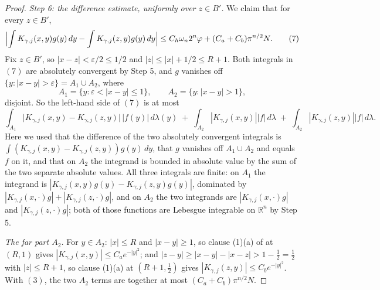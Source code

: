 \begin{proof}
\emph{Step 6: the difference estimate, uniformly over $z \in B'$.}
We claim that for every $z \in B'$,
\begin{equation*}
  \Bigl|\int K_{\gamma,j}(x,y)g(y)\,dy - \int K_{\gamma,j}(z,y)g(y)\,dy\Bigr|
    \leq C_h\omega_n2^n\varphi + (C_a+C_b)\pi^{n/2}N . \tag{7}
\end{equation*}
Fix $z \in B'$, so $|x-z| < \varepsilon/2 \leq 1/2$ and
$|z| \leq |x| + 1/2 \leq R+1$.  Both integrals in $(7)$ are absolutely
convergent by Step 5, and $g$ vanishes off
$\{y : |x-y| > \varepsilon\} = A_1 \cup A_2$, where
\[
  A_1 = \{y : \varepsilon < |x-y| \leq 1\}, \qquad A_2 = \{y : |x-y| > 1\} ,
\]
disjoint.  So the left-hand side of $(7)$ is at most
\[
  \int_{A_1}\bigl|K_{\gamma,j}(x,y)-K_{\gamma,j}(z,y)\bigr|\,|f(y)|\,d\lambda(y)
  \;+\;\int_{A_2}|K_{\gamma,j}(x,y)||f|\,d\lambda
  \;+\;\int_{A_2}|K_{\gamma,j}(z,y)||f|\,d\lambda .
\]
Here we used that the difference of the two absolutely convergent integrals is
$\int(K_{\gamma,j}(x,y)-K_{\gamma,j}(z,y))g(y)\,dy$, that $g$ vanishes off
$A_1 \cup A_2$ and equals $f$ on it, and that on $A_2$ the integrand is bounded
in absolute value by the sum of the two separate absolute values.  All three
integrals are finite: on $A_1$ the integrand is
$|K_{\gamma,j}(x,y)g(y) - K_{\gamma,j}(z,y)g(y)|$, dominated by
$|K_{\gamma,j}(x,\cdot)g| + |K_{\gamma,j}(z,\cdot)g|$, and on $A_2$ the two
integrands are $|K_{\gamma,j}(x,\cdot)g|$ and $|K_{\gamma,j}(z,\cdot)g|$; both
of those functions are Lebesgue integrable on $\mathbb{R}^n$ by Step 5.

\emph{The far part $A_2$.}  For $y \in A_2$: $|x| \leq R$ and $|x-y| \geq 1$,
so clause (1)(a) of  at $(R,1)$ gives
$|K_{\gamma,j}(x,y)| \leq C_ae^{-|y|^2}$; and
$|z-y| \geq |x-y| - |x-z| > 1 - \tfrac12 = \tfrac12$ with $|z| \leq R+1$, so
clause (1)(a) at $(R+1,\tfrac12)$ gives
$|K_{\gamma,j}(z,y)| \leq C_be^{-|y|^2}$.  With $(3)$, the two $A_2$ terms are
together at most $(C_a+C_b)\pi^{n/2}N$.


\end{proof}
